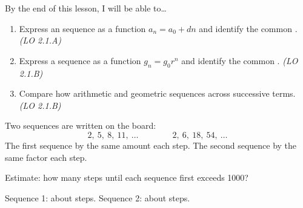 \documentclass[10pt]{article}
\begin{document}
\namedateperiod

\vspace{0.06in}

\begin{objectivebox}
By the end of this lesson, I will be able to\ldots
\begin{enumerate}[itemsep=2pt]
  \item Express an  sequence as a function $a_n = a_0 + dn$ and identify the
        common . \hfill\textit{(LO 2.1.A)}
  \item Express a  sequence as a function $g_n = g_0 r^n$ and identify the
        common . \hfill\textit{(LO 2.1.B)}
  \item Compare how arithmetic and geometric sequences  across successive terms. \hfill\textit{(LO 2.1.B)}
\end{enumerate}
\end{objectivebox}

\vspace{0.04in}

\begin{vocabbox}
\end{vocabbox}

\vspace{0.04in}

\begin{hookbox}
Two sequences are written on the board:
\[
  2,\ 5,\ 8,\ 11,\ \ldots \qquad\qquad 2,\ 6,\ 18,\ 54,\ \ldots
\]
The first sequence  by the same amount each step.
The second sequence  by the same factor each step.

\medskip
Estimate: how many steps until each sequence first exceeds 1000?

\medskip
Sequence 1: about  steps. \quad Sequence 2: about  steps.
\end{hookbox}

\vspace{0.04in}
\end{document}
